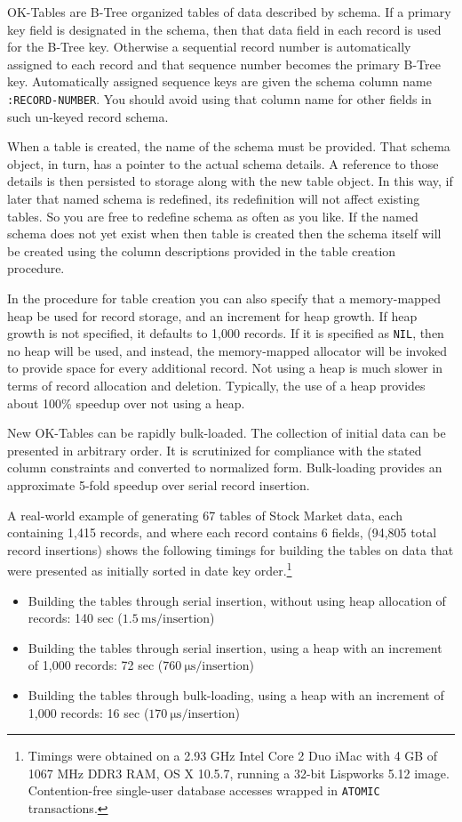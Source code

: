 \documentclass[article,oneside]{memoir}
\begin{document}
OK-Tables are B-Tree organized tables of data described by schema. If a primary key field is designated in the schema, then that data field in each record is used for the B-Tree key. Otherwise a sequential record number is automatically assigned to each record and that sequence number becomes the primary B-Tree key. Automatically assigned sequence keys are given the schema column name \texttt{:RECORD-NUMBER}. You should avoid using that column name for other fields in such un-keyed record schema.

When a table is created, the name of the schema must be provided. That schema object, in turn, has a pointer to the actual schema details. A reference to those details is then persisted to storage along with the new table object. In this way, if later that named schema is redefined, its redefinition will not affect existing tables. So you are free to redefine schema as often as you like. If the named schema does not yet exist when then table is created then the schema itself will be created using the column descriptions provided in the table creation procedure.

In the procedure for table creation you can also specify that a memory-mapped heap be used for record storage, and an increment for heap growth. If heap growth is not specified, it defaults to 1,000 records. If it is specified as \texttt{NIL}, then no heap will be used, and instead, the memory-mapped allocator will be invoked to provide space for every additional record. Not using a heap is much slower in terms of record allocation and deletion. Typically, the use of a heap provides about 100\% speedup over not using a heap.

New OK-Tables can be rapidly bulk-loaded. The collection of initial data can be presented in arbitrary order. It is scrutinized for compliance with the stated column constraints and converted to normalized form. Bulk-loading provides an approximate 5-fold speedup over serial record insertion.

A real-world example of generating 67 tables of Stock Market data, each containing 1,415 records, and where each record contains 6 fields,  (94,805 total record insertions) shows the following timings for building the tables on data that were presented as initially sorted in date key order.\footnote{Timings were obtained on a 2.93 GHz Intel Core 2 Duo iMac with 4 GB of 1067 MHz DDR3 RAM, OS X 10.5.7, running a 32-bit Lispworks 5.12 image. Contention-free single-user database accesses wrapped in \texttt{ATOMIC} transactions.}
\begin{itemize}
\item Building the tables through serial insertion, without using heap allocation of records: 140 sec ($1.5~ \mathrm{ms/insertion}$)

\item Building the tables through serial insertion, using a heap with an increment of 1,000 records: 72 sec ($760~ \mathrm{{\mu}s/insertion}$)

\item Building the tables through bulk-loading, using a heap with an increment of 1,000 records: 16 sec ($170~ \mathrm{{\mu}s/insertion}$)
\end{itemize} 
\end{document}
